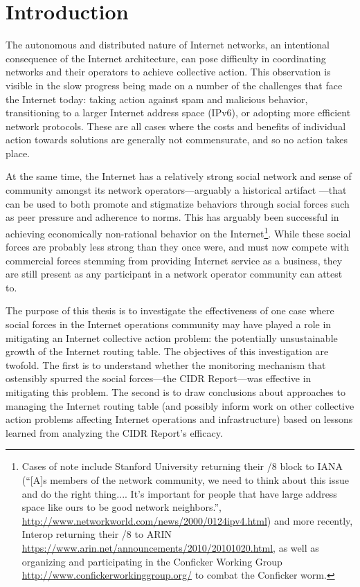 \chapter{Introduction}
\label{chap:intro}

The autonomous and distributed nature of Internet networks, an intentional
consequence of the Internet architecture, can pose difficulty in coordinating
networks and their operators to achieve collective action. This observation is
visible in the slow progress being made on a number of the challenges that face
the Internet today: taking action against spam and malicious behavior,
transitioning to a larger Internet address space (IPv6), or adopting more
efficient network protocols. These are all cases where the costs and benefits
of individual action towards solutions are generally not commensurate, and so
no action takes place.

At the same time, the Internet has a relatively strong social network and sense
of community amongst its network operators---arguably a historical artifact
\cite{Mathew:2010ly}---that can be used to both promote and stigmatize
behaviors through social forces such as peer pressure and adherence to norms.
This has arguably been successful in achieving economically non-rational
behavior on the Internet\footnote{Cases of note include Stanford University
returning their /8 block to IANA (``[A]s members of the network community, we
need to think about this issue and do the right thing.... It's important for
people that have large address space like ours to be good network neighbors.'',
\url{http://www.networkworld.com/news/2000/0124ipv4.html}) and more recently,
Interop returning their /8 to ARIN
\url{https://www.arin.net/announcements/2010/20101020.html}, as well as
organizing and participating in the Conficker Working Group
\url{http://www.confickerworkinggroup.org/} to combat the Conficker worm.
}.
While these social forces are probably less strong than they once were, and
must now compete with commercial forces stemming from providing Internet
service as a business, they are still present as any participant in a network
operator community can attest to.

The purpose of this thesis is to investigate the effectiveness of one case
where social forces in the Internet operations community may have played a role
in mitigating an Internet collective action problem: the potentially
unsustainable growth of the Internet routing table. The objectives of this
investigation are twofold. The first is to understand whether the monitoring
mechanism that ostensibly spurred the social forces---the CIDR Report---was
effective in mitigating this problem. The second is to draw conclusions about
approaches to managing the Internet routing table (and possibly inform work on
other collective action problems affecting Internet operations and
infrastructure) based on lessons learned from analyzing the CIDR Report's
efficacy.
%


